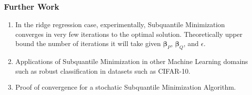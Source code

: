 \documentclass[
11pt, %
serif
]{beamer}
\begin{document}
	
	

	
	\begin{frame}
		\frametitle{Further Work}
		\begin{enumerate}
			\item In the ridge regression case, experimentally, Subquantile Minimization converges in very few iterations to the optimal solution. Theoretically upper bound the number of iterations it will take given $\boldsymbol{\beta}_P$, $\boldsymbol{\beta}_Q$, and $\epsilon$. 
			\item 
			Applications of Subquantile Minimization in other Machine Learning domains such as robust classification in datasets such as CIFAR-10.
			\item 
			Proof of convergence for a stochatic Subquantile Minimization Algorithm.
		\end{enumerate}
	\end{frame}
	
\end{document}

